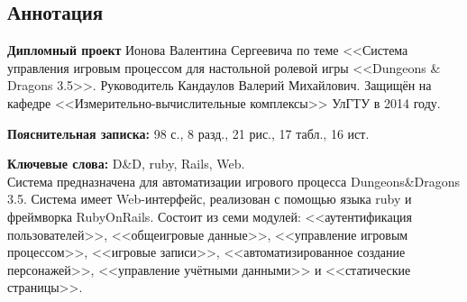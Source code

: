 \begin{titlepage}


\section*{Аннотация}
\noindent\textbf{Дипломный проект} Ионова Валентина Сергеевича по теме <<Система управления игровым процессом для настольной ролевой игры <<Dungeons \& Dragons 3.5>>.
Руководитель Кандаулов Валерий Михайлович. Защищён на кафедре <<Измерительно-вычислительные комплексы>> УлГТУ в 2014 году.

\noindent\textbf{Пояснительная записка:} 98 с., 8 разд., 21 рис., 17 табл., 16 ист.

\noindent\textbf{Ключевые слова:} D\&D, ruby, Rails, Web.\\[1cm]
\noindent Система предназначена для автоматизации игрового процесса Dungeons\&Dragons 3.5. Система имеет Web-интерфейс, реализован с помощью языка ruby и фреймворка RubyOnRails. Состоит из семи модулей: <<аутентификация пользователей>>, <<общеигровые данные>>, <<управление игровым процессом>>, <<игровые записи>>, <<автоматизированное создание персонажей>>, <<управление учётными данными>> и <<статические страницы>>.

\end{titlepage}

\restoregeometry

